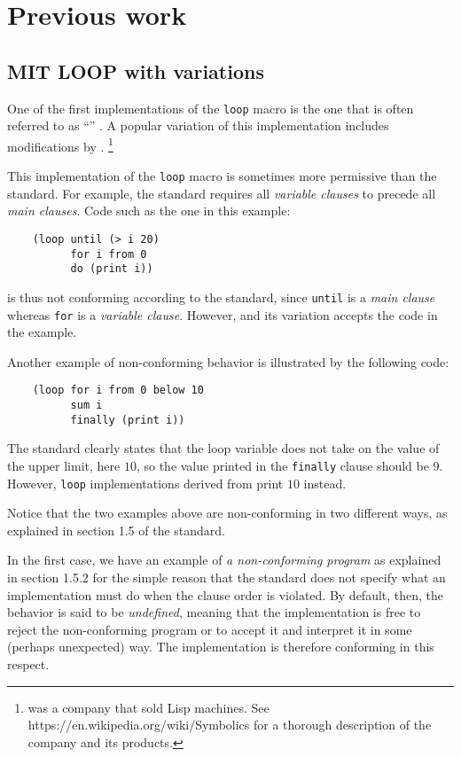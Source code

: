 \section{Previous work}

\subsection{MIT LOOP with variations}
\label{sec-mit-loop}

One of the first implementations of the \commonlisp{} \texttt{loop}
macro is the one that is often referred to as ``\mitloop{}''
\cite{Burke:Moon:MIT.loop}.  A popular variation of this
implementation includes modifications by \symbolics{}.%
\footnote{\symbolics{} was a company that sold Lisp machines.  See
  https://en.wikipedia.org/wiki/Symbolics for a thorough description
  of the company and its products.}

This implementation of the \texttt{loop} macro is sometimes more
permissive than the \commonlisp{} standard.  For example, the standard
requires all \emph{variable clauses} to precede all \emph{main
  clauses}.   Code such as the one in this example:

\begin{verbatim}
    (loop until (> i 20)
          for i from 0
          do (print i))
\end{verbatim}

\noindent
is thus not conforming according to the standard, since \texttt{until}
is a \emph{main clause} whereas \texttt{for} is a \emph{variable
  clause}.  However, \mitloop{} and its variation accepts the code in
the example.

Another example of non-conforming behavior is illustrated by the
following code:

\begin{verbatim}
    (loop for i from 0 below 10
          sum i
          finally (print i))
\end{verbatim}

The \commonlisp{} standard clearly states that the loop variable does
not take on the value of the upper limit, here $10$, so the value
printed in the \texttt{finally} clause should be $9$.  However,
\texttt{loop} implementations derived from \mitloop{} print $10$
instead.

Notice that the two examples above are non-conforming in two different
ways, as explained in section 1.5 of the \commonlisp{} standard.

In the first case, we have an example of \emph{a non-conforming
  program} as explained in section 1.5.2 for the simple reason that
the standard does not specify what an implementation must do when the
clause order is violated.  By default, then, the behavior is said to
be \emph{undefined}, meaning that the implementation is free to reject
the non-conforming program or to accept it and interpret it in some
(perhaps unexpected) way.  The \mitloop{} implementation is therefore
conforming in this respect.

